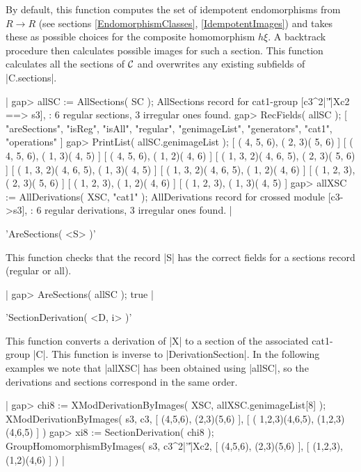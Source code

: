 By default, this function computes the set of idempotent endomorphisms
from    $R    \to   R$   (see     sections  \ref{EndomorphismClasses},
\ref{IdempotentImages}) and takes  these  as possible choices  for the
composite homomorphism $h\xi$.   A backtrack procedure then calculates
possible images for such a  section.  This function calculates all the
sections  of  ${\cal C}$  and  overwrites any   existing subfields  of
|C.sections|.

|    gap> allSC := AllSections( SC );
    AllSections record for cat1-group [c3^2|'\|'|Xc2 ==> s3],
    : 6 regular sections,  3 irregular ones found. 
    gap> RecFields( allSC );
    [ "areSections", "isReg", "isAll", "regular", "genimageList",
      "generators", "cat1", "operations" ]
    gap> PrintList( allSC.genimageList );
    [ ( 4, 5, 6), ( 2, 3)( 5, 6) ]
    [ ( 4, 5, 6), ( 1, 3)( 4, 5) ]
    [ ( 4, 5, 6), ( 1, 2)( 4, 6) ]
    [ ( 1, 3, 2)( 4, 6, 5), ( 2, 3)( 5, 6) ]
    [ ( 1, 3, 2)( 4, 6, 5), ( 1, 3)( 4, 5) ]
    [ ( 1, 3, 2)( 4, 6, 5), ( 1, 2)( 4, 6) ]
    [ ( 1, 2, 3), ( 2, 3)( 5, 6) ]
    [ ( 1, 2, 3), ( 1, 2)( 4, 6) ]
    [ ( 1, 2, 3), ( 1, 3)( 4, 5) ] 
    gap> allXSC := AllDerivations( XSC, "cat1" );
    AllDerivations record for crossed module [c3->s3],
    : 6 regular derivations,  3 irregular ones found.   |

%

'AreSections( <S> )'

This function checks that the record |S| has  the correct fields for a
sections record (regular or all).

|    gap> AreSections( allSC );
    true |

%

'SectionDerivation( <D, i> )'

This function   converts  a derivation  of  |X|  to a  section  of the
associated cat1-group      |C|.  This    function  is    inverse    to
|DerivationSection|.  In the following  examples we note that |allXSC|
has  been  obtained using |allSC|,   so the  derivations and  sections
correspond in the same order.

|    gap> chi8 := XModDerivationByImages( XSC, allXSC.genimageList[8] );
    XModDerivationByImages( s3, c3, [ (4,5,6), (2,3)(5,6) ], 
       [ ( 1,2,3)(4,6,5), (1,2,3)(4,6,5) ] )
    gap> xi8 := SectionDerivation( chi8 );
    GroupHomomorphismByImages( s3, c3^2|'\|'|Xc2,
        [ (4,5,6), (2,3)(5,6) ], [ (1,2,3), (1,2)(4,6) ] )  |

